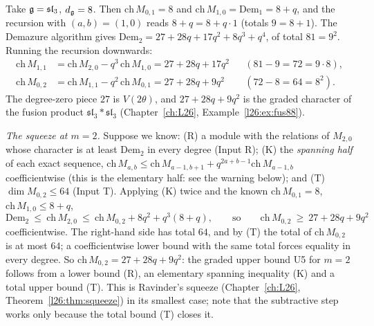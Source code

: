 \begin{example}\label{l27:ex:sl3}
Take $\mathfrak g=\mathfrak{sl}_3$, $d_{\mathfrak g}=8$. Then $\mathrm{ch}\,M_{0,1}=8$ and $\mathrm{ch}\,M_{1,0}=\mathrm{Dem}_1=8+q$,
and the recursion with $(a,b)=(1,0)$ reads $8+q=8+q\cdot1$ (totals $9=8+1$). The Demazure algorithm gives
$\mathrm{Dem}_2=27+28q+17q^2+8q^3+q^4$, of total $81=9^2$. Running the recursion downwards:
\begin{align*}
\mathrm{ch}\,M_{1,1}&=\mathrm{ch}\,M_{2,0}-q^3\,\mathrm{ch}\,M_{1,0}=27+28q+17q^2 &&(81-9=72=9\cdot8),\\
\mathrm{ch}\,M_{0,2}&=\mathrm{ch}\,M_{1,1}-q^2\,\mathrm{ch}\,M_{0,1}=27+28q+9q^2 &&(72-8=64=8^2).
\end{align*}
The degree-zero piece $27$ is $V(2\theta)$, and $27+28q+9q^2$ is the graded character of the fusion product $\mathfrak{sl}_3*\mathfrak{sl}_3$
(Chapter~\ref{ch:L26}, Example~\ref{l26:ex:fus88}).

\emph{The squeeze at $m=2$.} Suppose we know: (R) a module with the relations of $M_{2,0}$ whose character is at least
$\mathrm{Dem}_2$ in every degree (Input R); (K) the \emph{spanning half} of each exact sequence,
$\mathrm{ch}\,M_{a,b}\le\mathrm{ch}\,M_{a-1,b+1}+q^{2a+b-1}\mathrm{ch}\,M_{a-1,b}$ coefficientwise (this is the elementary half:
see the warning below); and (T) $\dim M_{0,2}\le64$ (Input T). Applying (K) twice and the known $\mathrm{ch}\,M_{0,1}=8$,
$\mathrm{ch}\,M_{1,0}\le8+q$,
\begin{equation*}
\mathrm{Dem}_2\ \le\ \mathrm{ch}\,M_{2,0}\ \le\ \mathrm{ch}\,M_{0,2}+8q^2+q^3(8+q),
\qquad\text{so}\qquad \mathrm{ch}\,M_{0,2}\ \ge\ 27+28q+9q^2
\end{equation*}
coefficientwise. The right-hand side has total $64$, and by (T) the total of $\mathrm{ch}\,M_{0,2}$ is at most $64$; a
coefficientwise lower bound with the same total forces equality in every degree. So $\mathrm{ch}\,M_{0,2}=27+28q+9q^2$: the
graded upper bound U5 for $m=2$ follows from a lower bound (R), an elementary spanning inequality (K) and a total upper bound
(T). This is Ravinder's squeeze (Chapter~\ref{ch:L26}, Theorem~\ref{l26:thm:squeeze}) in its smallest case; note that the
subtractive step works only because the total bound (T) closes it.
\end{example}

